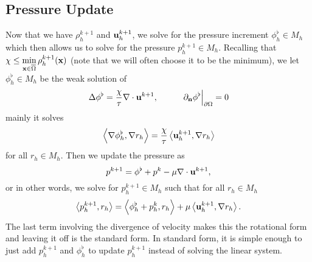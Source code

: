 \documentclass[letterpaper]{erdc}
\begin{document}
%
\subsection{Pressure Update}
Now that we have $\rho_h^{k+1}$ and $\textbf{u}_h^{k+1}$, we solve for the pressure increment $\phi_h^{\flat}\in M_h$ which then allows us to solve for the pressure $p_h^{k+1}\in M_h$.  
Recalling that $\chi \leq \displaystyle\min_{\textbf{x}\in\overline{\Omega}} \rho_h^{k+1}(\textbf{x})$ (note that we will often choose it to be the minimum), we let $\phi_h^{\flat}\in M_h$ be the weak solution of
\begin{equation}\label{eqn:pressureincrementlaplacian}
  \Delta \phi^{\flat} = \frac{\chi}{\tau}\nabla\cdot \textbf{u}^{k+1}, \hspace{1cm} \left.\partial_{\textbf{n}}\phi^{\flat}\right|_{\partial\Omega} = 0
\end{equation}
mainly it solves
\begin{equation}
  \left\langle \nabla\phi_h^{\flat}, \nabla r_h \right\rangle = \frac{\chi}{\tau}\left\langle \textbf{u}_h^{k+1}, \nabla r_h \right\rangle
\end{equation}
for all $r_h \in M_h$.  Then we update the pressure as
\begin{equation}\label{eqn:rotationalpressureupdate}
  p^{k+1} = \phi^{\flat} + p^{k} - \mu\nabla\cdot \textbf{u}^{k+1},
\end{equation}
or in other words, we solve for $p_h^{k+1}\in M_h$ such that for all $r_h\in M_h$
\begin{equation}
  \left\langle p_h^{k+1}, r_h \right\rangle = \left\langle \phi_h^{\flat} + p_h^{k}, r_h \right\rangle + \mu\left\langle \textbf{u}_h^{k+1}, \nabla r_h \right\rangle.
\end{equation}
The last term involving the divergence of velocity makes this the rotational form and leaving it off is the standard form.  In standard form, it is simple enough to just add $p_h^{k+1}$ and $\phi_h^{\flat}$ to update $p_h^{k+1}$ instead of solving the linear system.
\end{document}
